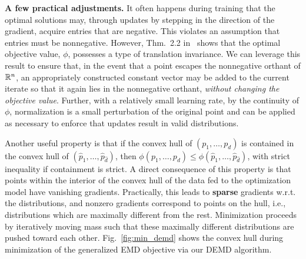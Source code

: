 {\bf A few practical adjustments.}
It often happens during training that the optimal solutions may, through updates by stepping in the direction of the gradient, acquire entries that are negative. 
This violates an assumption that entries must be nonnegative. However, Thm.~2.2 in~\cite{kline2019properties} shows that the optimal objective value, $\phi$, possesses a type of translation invariance.  We can leverage this result to ensure that, in the event that a point escapes the nonnegative orthant of $\mathbb{R}^{n}$,
an appropriately constructed constant vector may be added to the current iterate so that it again lies in the nonnegative orthant, \textit{without changing the objective value}. 
Further, with a
relatively small learning rate, by the continuity of $\phi$, normalization is a small perturbation of the original point and can be applied as necessary to enforce that updates result in valid distributions. 

\begin{remark}
Another useful property is that if the convex hull of $(p_1,\ldots,p_d)$ is contained in the convex hull of $(\hat{p}_1,\ldots,\hat{p}_{\hat{d}})$, then $\phi(p_1,\ldots,p_d)\leq \phi(\hat{p}_1,\ldots,\hat{p}_{\hat{d}})$, with strict inequality if containment is strict.
A direct consequence of this property is that points within the interior of the convex hull of the data fed to the optimization model have vanishing gradients.
Practically, this leads to \textbf{sparse} gradients w.r.t. the distributions, and nonzero gradients correspond to points on the hull, i.e., distributions which are maximally different from the rest.
Minimization proceeds by iteratively moving mass such that these maximally different distributions are pushed toward each other.
Fig.~\ref{fig:min_demd} shows the convex hull during minimization of the generalized EMD objective via our DEMD algorithm.
\end{remark}

